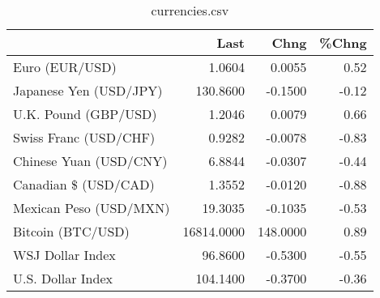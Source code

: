 \documentclass{article}%
\begin{document}
%


\begin{table}[htbp]%
\caption{currencies.csv}%
\centering%
\begin{adjustbox}{width=1\textwidth}%
\begin{tabular}{lrrr}
\toprule
                       &       Last &     Chng &  \%Chng \\
\midrule
        Euro (EUR/USD) &     1.0604 &   0.0055 &   0.52 \\
Japanese Yen (USD/JPY) &   130.8600 &  -0.1500 &  -0.12 \\
  U.K. Pound (GBP/USD) &     1.2046 &   0.0079 &   0.66 \\
 Swiss Franc (USD/CHF) &     0.9282 &  -0.0078 &  -0.83 \\
Chinese Yuan (USD/CNY) &     6.8844 &  -0.0307 &  -0.44 \\
  Canadian \$ (USD/CAD) &     1.3552 &  -0.0120 &  -0.88 \\
Mexican Peso (USD/MXN) &    19.3035 &  -0.1035 &  -0.53 \\
     Bitcoin (BTC/USD) & 16814.0000 & 148.0000 &   0.89 \\
      WSJ Dollar Index &    96.8600 &  -0.5300 &  -0.55 \\
     U.S. Dollar Index &   104.1400 &  -0.3700 &  -0.36 \\
\bottomrule
\end{tabular}
%
\end{adjustbox}%
\end{table}

%
\end{document}
